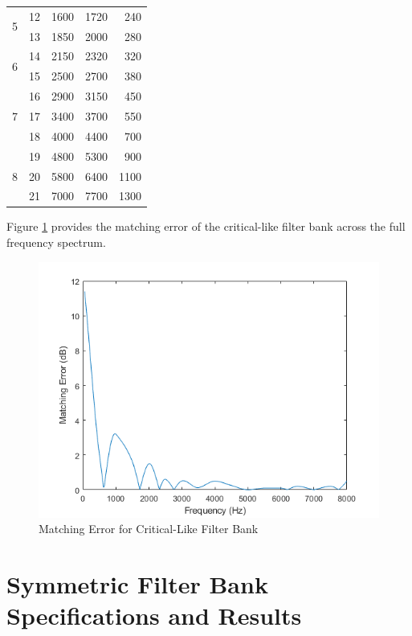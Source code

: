 \documentclass[12pt, onecolumn]{article}
\begin{document}
\begin{appendices}
\begin{table}[htbp]
\begin{adjustbox}{width=0.9\linewidth}
\begin{tabular}{|c|r|r|r|r|}
    \hline
    \multirow{2}[4]{*}{5} & 12    & 1600  & 1720  & 240 \\
\cline{2-5}          & 13    & 1850  & 2000  & 280 \\
    \hline
    \multirow{2}[4]{*}{6} & 14    & 2150  & 2320  & 320 \\
\cline{2-5}          & 15    & 2500  & 2700  & 380 \\
    \hline
    \multirow{3}[6]{*}{7} & 16    & 2900  & 3150  & 450 \\
\cline{2-5}          & 17    & 3400  & 3700  & 550 \\
\cline{2-5}          & 18    & 4000  & 4400  & 700 \\
    \hline
    \multirow{3}[6]{*}{8} & 19    & 4800  & 5300  & 900 \\
\cline{2-5}          & 20    & 5800  & 6400  & 1100 \\
\cline{2-5}          & 21    & 7000  & 7700  & 1300 \\
    \hline
    \end{tabular}%
    \end{adjustbox}
  \label{tab:critFiltFreqBand}%
\end{table}%

\noindent Figure \ref{fig:critMatErr} provides the matching error of the critical-like filter bank across the full frequency spectrum.

\begin{figure}[h]
\centering
\includegraphics[width=0.6\linewidth]{critMatErr.PNG}
\caption{Matching Error for Critical-Like Filter Bank}
\label{fig:critMatErr}
\end{figure}  

\section{Symmetric Filter Bank Specifications and Results} 
\label{app:symFreqBands}


\end{appendices}
\end{document}
